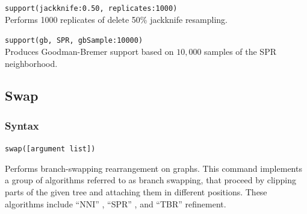 		\begin{example}
			\item{\texttt{support(jackknife:0.50, replicates:1000)}\\Performs 1000 replicates of 
			delete 50\% jackknife resampling.}
				
			\item{\texttt{support(gb, SPR, gbSample:10000)}\\Produces Goodman-Bremer 
			support based on $10,000$ samples of the SPR neighborhood.}
		\end{example}

\subsection{Swap} 
	\subsubsection{Syntax}
		\texttt{swap([argument list])}
			
	\begin{phygdescription}
		{Performs branch-swapping rearrangement on graphs. This command implements a 
		group of algorithms referred to as branch swapping, that proceed by clipping
		parts of the given tree and attaching them in different positions. These algorithms 
		include ``NNI'' \citep{CaminandSokal1965, Robinson1971}, ``SPR'' \citep{Dayhoff1969}, 
		and ``TBR'' \citep{Farris1988, swofford1990a} refinement.}
	\end{phygdescription}
		
